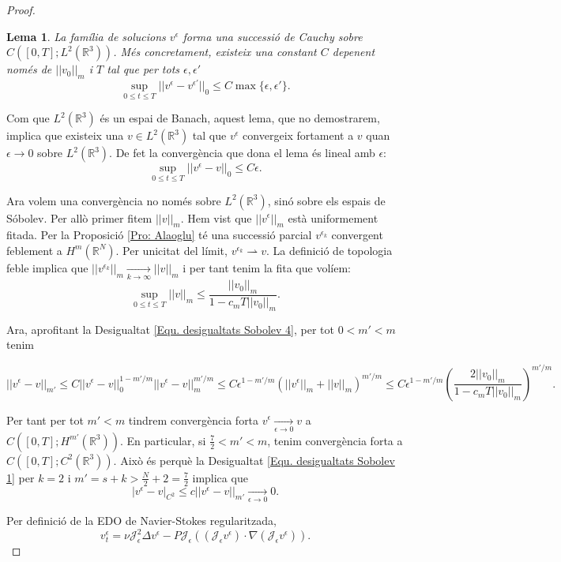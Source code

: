 \documentclass{article}
\numberwithin{equation}{section}
\newtheorem{lema}{Lema}[section]
\begin{document}
\begin{proof}
\begin{lema}
La fam\'{i}lia de solucions $v^{\epsilon}$ forma una successi\'{o} de Cauchy sobre $C([0,T];L^2(\mathbb{R}^3))$. M\'{e}s concretament, existeix una constant $C$ depenent nom\'{e}s de $||v_0||_m$ i $T$ tal que per tots $\epsilon,\epsilon'$
\[\sup_{0\leq t\leq T}||v^{\epsilon}-v^{\epsilon'}||_0\leq C\max\{\epsilon,\epsilon'\}.\]
\end{lema}

Com que $L^2(\mathbb{R}^3)$ \'{e}s un espai de Banach, aquest lema, que no demostrarem, implica que existeix una $v\in L^2(\mathbb{R}^3)$ tal que $v^{\epsilon}$ convergeix fortament a $v$ quan $\epsilon\to0$ sobre $L^2(\mathbb{R}^3)$. De fet la converg\`{e}ncia que dona el lema \'{e}s lineal amb $\epsilon$:
\[\sup_{0\leq t\leq T}||v^{\epsilon}-v||_0\leq C\epsilon.\]

Ara volem una converg\`{e}ncia no nom\'{e}s sobre $L^2(\mathbb{R}^3)$, sin\'{o} sobre els espais de S\'{o}bolev. Per all\`{o} primer fitem $||v||_m$. Hem vist que $||v^{\epsilon}||_m$ est\`{a} uniformement fitada. Per la Proposici\'{o} \ref{Pro: Alaoglu} t\'{e} una successi\'{o} parcial $v^{\epsilon_k}$ convergent feblement a $H^m(\mathbb{R}^N)$. Per unicitat del l\'{i}mit, $v^{\epsilon_k}\rightharpoonup v$. La definici\'{o} de topologia feble implica que $||v^{\epsilon_k}||_m\xrightarrow[k\to\infty]{}||v||_m$ i per tant tenim la fita que vol\'{i}em:
\[\sup_{0\leq t\leq T}||v||_m\leq\frac{||v_0||_m}{1-c_mT||v_0||_m}.\]

Ara, aprofitant la Desigualtat \eqref{Equ. desigualtats Sobolev 4}, per tot $0<m'<m$ tenim

\[||v^{\epsilon}-v||_{m'}\leq C||v^{\epsilon}-v||_0^{1-m'/m}||v^{\epsilon}-v||_m^{m'/m}\leq C\epsilon^{1-m'/m}(||v^{\epsilon}||_m+||v||_m)^{m'/m}\leq C\epsilon^{1-m'/m}\left(\frac{2||v_0||_m}{1-c_mT||v_0||_m}\right)^{m'/m}.\]

Per tant per tot $m'<m$ tindrem converg\`{e}ncia forta $v^{\epsilon}\xrightarrow[\epsilon\to0]{}v$ a $C([0,T];H^{m'}(\mathbb{R}^3))$. En particular, si $\frac{7}{2}<m'<m$, tenim converg\`{e}ncia forta a $C([0,T];C^2(\mathbb{R}^3))$. Aix\`{o} \'{e}s perqu\`{e} la Desigualtat \eqref{Equ. desigualtats Sobolev 1} per $k=2$ i $m'=s+k>\frac{N}{2}+2=\frac{7}{2}$ implica que
\[|v^{\epsilon}-v|_{C^2}\leq c||v^{\epsilon}-v||_{m'}\xrightarrow[\epsilon\to0]{}0.\]

Per definici\'{o} de la EDO de Navier-Stokes regularitzada,
\[v_t^{\epsilon}=\nu\mathcal{J}_{\epsilon}^2\Delta v^{\epsilon}-P\mathcal{J}_{\epsilon}((\mathcal{J}_{\epsilon}v^{\epsilon})\cdot\nabla(\mathcal{J}_{\epsilon}v^{\epsilon})).\]


\end{proof}
\end{document}
